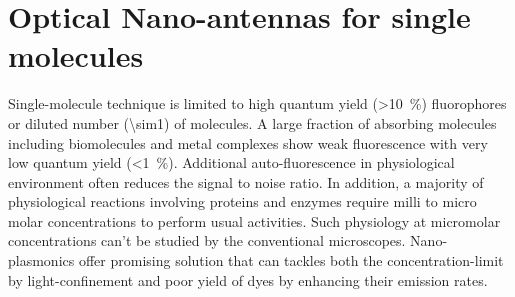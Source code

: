 \section{Optical Nano-antennas for single molecules}
Single-molecule technique is limited to high quantum yield (\SI{>10}{\percent}) fluorophores or diluted number (\SI{\sim1}{\nM}) of molecules.
A large fraction of absorbing molecules including biomolecules and metal complexes show weak fluorescence with very low quantum yield (\SI{<1}{\percent}).
Additional auto-fluorescence in physiological environment often reduces the signal to noise ratio.
In addition, a majority of physiological reactions involving proteins and enzymes require milli to micro molar concentrations to perform usual activities.\cite{craighead2006future,punj2013gold,fabrizio2016roadmap,punj2014thesis}
Such physiology at micromolar concentrations can't be studied by the conventional microscopes.
Nano-plasmonics offer promising solution that can tackles both the concentration-limit by light-confinement and poor yield of dyes by enhancing their emission rates.

